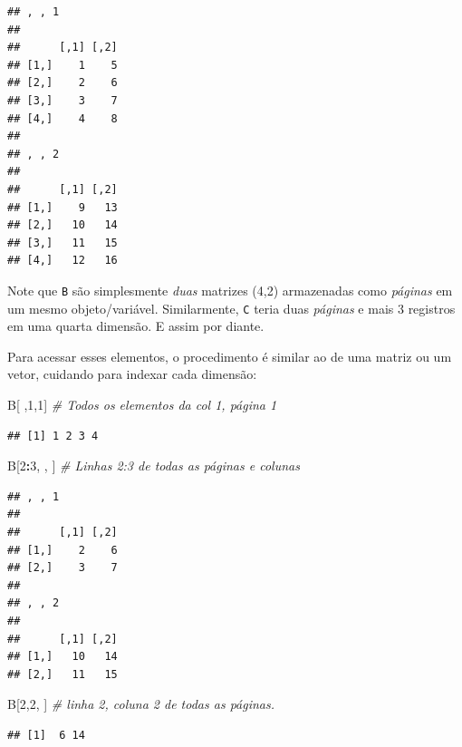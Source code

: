 \documentclass[
]{book}
\newenvironment{Shaded}{\begin{snugshade}}{\end{snugshade}}
\newcommand{\CommentTok}[1]{\textcolor[rgb]{0.56,0.35,0.01}{\textit{#1}}}
\newcommand{\DecValTok}[1]{\textcolor[rgb]{0.00,0.00,0.81}{#1}}
\newcommand{\NormalTok}[1]{#1}
\newcommand{\OperatorTok}[1]{\textcolor[rgb]{0.81,0.36,0.00}{\textbf{#1}}}
\theoremstyle{definition}
\theoremstyle{definition}
\theoremstyle{definition}
\theoremstyle{remark}
\begin{document}
\begin{verbatim}
## , , 1
## 
##      [,1] [,2]
## [1,]    1    5
## [2,]    2    6
## [3,]    3    7
## [4,]    4    8
## 
## , , 2
## 
##      [,1] [,2]
## [1,]    9   13
## [2,]   10   14
## [3,]   11   15
## [4,]   12   16
\end{verbatim}

Note que \texttt{B} são simplesmente \emph{duas} matrizes (4,2) armazenadas como \emph{páginas} em um mesmo objeto/variável. Similarmente, \texttt{C} teria duas \emph{páginas} e mais 3 registros em uma quarta dimensão. E assim por diante.

Para acessar esses elementos, o procedimento é similar ao de uma matriz ou um vetor, cuidando para indexar cada dimensão:

\begin{Shaded}
\begin{Highlighting}[]
\NormalTok{B[ ,}\DecValTok{1}\NormalTok{,}\DecValTok{1}\NormalTok{]    }\CommentTok{# Todos os elementos da col 1, página 1 }
\end{Highlighting}
\end{Shaded}

\begin{verbatim}
## [1] 1 2 3 4
\end{verbatim}

\begin{Shaded}
\begin{Highlighting}[]
\NormalTok{B[}\DecValTok{2}\OperatorTok{:}\DecValTok{3}\NormalTok{, , ]  }\CommentTok{# Linhas 2:3 de todas as páginas e colunas}
\end{Highlighting}
\end{Shaded}

\begin{verbatim}
## , , 1
## 
##      [,1] [,2]
## [1,]    2    6
## [2,]    3    7
## 
## , , 2
## 
##      [,1] [,2]
## [1,]   10   14
## [2,]   11   15
\end{verbatim}

\begin{Shaded}
\begin{Highlighting}[]
\NormalTok{B[}\DecValTok{2}\NormalTok{,}\DecValTok{2}\NormalTok{, ]    }\CommentTok{# linha 2, coluna 2 de todas as páginas.}
\end{Highlighting}
\end{Shaded}

\begin{verbatim}
## [1]  6 14
\end{verbatim}
\end{document}
